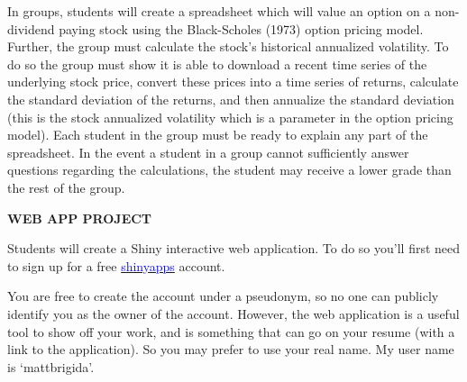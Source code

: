 \documentclass{article}
\begin{document}
In groups, students will create a spreadsheet which will value an option on a non-dividend
paying stock using the Black-Scholes (1973) option pricing model. Further, the group must calculate
the stock's historical annualized volatility. To do so the group must show it is able to download a recent
time series of the underlying stock price, convert these prices into a time series of returns, calculate the
standard deviation of the returns, and then annualize the standard deviation (this is the stock annualized
volatility which is a parameter in the option pricing model). Each student in the group must be ready to
explain any part of the spreadsheet. In the event a student in a group cannot sufficiently answer
questions regarding the calculations, the student may receive a lower grade than the rest of the group. 
\vspace*{5pt}
\begin{center}
{\bf WEB APP PROJECT}
\end{center}
Students will create a Shiny interactive web application.  To do so you'll first need to sign up for a free \href{https://www.shinyapps.io/}{\textcolor{blue}{shinyapps}} account.  

You are free to create the account under a pseudonym, so no one can publicly identify you as the owner of the account.  However, the web application is a useful tool to show off your work, and is something that can go on your resume (with a link to the application).  So you may prefer to use your real name.  My user name is `mattbrigida'.  
\end{document}
